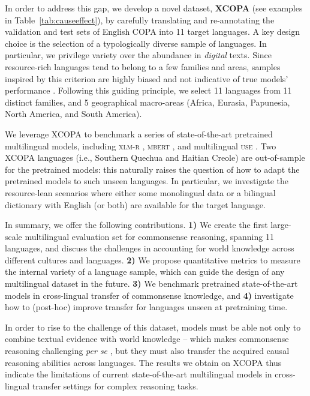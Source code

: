 \documentclass[11pt,a4paper]{article}
\begin{document}
In order to address this gap, we develop a novel dataset, \textbf{XCOPA} (see examples in Table~\ref{tab:causeeffect}), by carefully translating and re-annotating the validation and test sets of English COPA into 11 target languages. A key design choice is the selection of a typologically diverse sample of languages. In particular, we privilege variety over the abundance in \textit{digital} texts. 
Since resource-rich languages tend to belong to a few families and areas, samples inspired by this criterion are highly biased and not indicative of true models' performance \citep{gerz-etal-2018-relation,Ponti:2019cl,Joshi:2020arxiv,lauscher2020zero}.
Following this guiding principle, we select 11 languages from 11 distinct families, and 5 geographical macro-areas (Africa, Eurasia, Papunesia, North America, and South America). 





We leverage XCOPA to benchmark a series of state-of-the-art pretrained multilingual models, including \textsc{xlm-r} \citep{conneau2019unsupervised}, \textsc{mbert} \citep{Devlin:2019bert}, and multilingual \textsc{use} \citep{yang2019multilingual}. Two XCOPA languages (i.e., Southern Quechua and Haitian Creole) are out-of-sample for the pretrained models: this naturally raises the question of how to adapt the pretrained models to such unseen languages. 
In particular, we investigate the resource-lean scenarios where either some monolingual data or a bilingual dictionary with English (or both) are available for the target language. 

In summary, we offer the following contributions. \textbf{1)} We create the first large-scale multilingual evaluation set for commonsense reasoning, spanning 11 languages, and discuss the challenges in accounting for world knowledge across different cultures and languages. \textbf{2)}  We propose quantitative metrics to measure the internal variety of a language sample, which can guide the design of any multilingual dataset in the future. \textbf{3)} We benchmark pretrained state-of-the-art models in cross-lingual transfer of commonsense knowledge, and \textbf{4)} investigate how to (post-hoc) improve transfer for languages unseen at pretraining time. 



In order to rise to the challenge of this dataset, models must be able not only to combine textual evidence with world knowledge -- which makes commonsense reasoning challenging \textit{per se} \cite{Talmor:2019naacl,Rajani2019acl}, but they must also transfer the acquired causal reasoning abilities across languages. The results we obtain on XCOPA thus indicate the limitations of current state-of-the-art multilingual models in cross-lingual transfer settings for complex reasoning tasks. 
\end{document}
